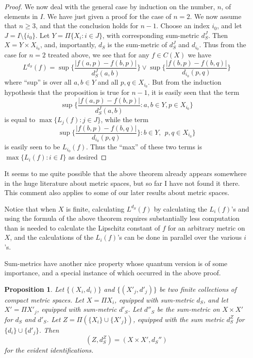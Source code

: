 \documentclass{amsart}[14pt]
\newtheorem{proposition}[theorem]{Proposition}
\theoremstyle{definition}
\theoremstyle{remark}
\newcommand{\<}{\langle}
\renewcommand{\>}{\rangle}
\numberwithin{equation}{section}
\begin{document}
{\begin{proof}
We now deal with the general case by induction on the 
number, $n$, of elements in $I$. 
 We have just given
a proof for the case of $n=2$. We now assume that $n \geq 3$,
and that the conclusion holds for $n-1$. Choose an index $i_0$,
 and let $J=I \setminus \{i_0\}$. 
Let $Y=\Pi\{X_i: i \in J\}$, with corresponding sum-metric $d_S^J$.
Then $X = Y\times X_{i_0}$, and, importantly, $d_S$ is the sum-metric
of $d_S^J$ and $d_{i_0}$. Thus from the case for $n=2$ treated above,
we see that for any $f \in C(X)$ we have
\[
L^{d_S}(f) = \sup\{\frac{|f(a,p) - f(b,p)|}{d_S^J(a,b)} \}
\vee \sup \{ \frac{|f(b,p)- f(b,q)|}{d_{i_0}(p,q)}\} 
\]
where ``sup'' is over all $a,b \in Y$ and all $p, q \in X_{i_0}$.
But from the induction hypothesis that the proposition is true
for $n-1$, it is easily seen that the term
\[
\sup{\{\frac{|f(a,p) - f(b,p)|}{d_S^J(a,b)}: a, b \in Y, p \in X_{i_0}\} }
\]
is equal to $ \max\{ L_j(f): j \in J\}$,
while the term
\[
\sup\{ \frac{|f(b,p)- f(b,q)|}{d_{i_0}(p,q)}\} : b \in Y, \ \ p, q \in X_{i_0}\}
\]
is easily seen to be $L_{i_0}(f)$. Thus the ``max'' of these two terms is
$ \max\{ L_i(f): i \in I\}$ as desired
\end{proof}

It seems to me quite possible that the above theorem already appears
somewhere in the huge literature about metric spaces, but so far
I have not found it there. This comment also applies to some of
our later results about metric spaces.

Notice that when $X$ is finite, 
calculating $L^{d_S}(f)$ by calculating the $L_i(f)$'s and
using the formula of the above theorem requires substantially less
computation than is needed to calculate the Lipschitz constant of $f$
for an arbitrary metric on $X$, and the calculations of the $L_i(f)$'s
can be done in parallel over the various $i$'s.

Sum-metrics have another nice property whose quantum version is of 
some importance, and a special instance of which occurred in the 
above proof.

\begin{proposition}
\label{sumadd}
Let $\{(X_i, d_i)\}$ and 
$\{(X'_j, d'_j)\}$ be two finite collections of 
compact metric spaces. Let $X = \Pi X_i$, equipped with sum-metric
$d_S$, and let $X' = \Pi X'_j$, equipped with sum-metric $d'_S$.
Let $d''_S$ be the sum-metric on $X \times X'$ for $d_S$ and $d'_S$.
Let $Z = \Pi ( \{X_i\}\cup \{X'_j\})$, equipped with the sum metric $d^Z_S$
for $\{d_i\}\cup \{d'_j\}$. Then
\[
(Z, d^Z_S) = (X\times X', d_S'')
\]
for the evident identifications.
\end{proposition}

}
\end{document}
